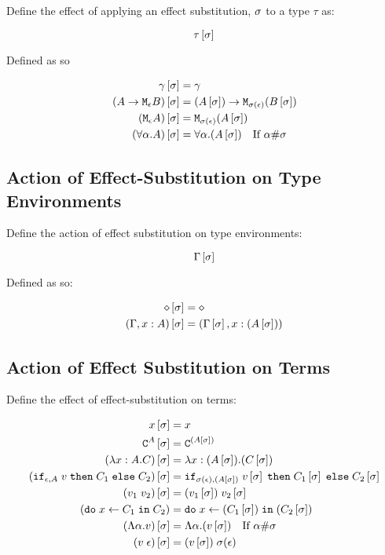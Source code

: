 {    Define the effect of applying an effect substitution, $\si$ to a type $\tau$ as:

    $$\tau\sub{\si}$$

    Defined as so

    \begin{align}
        \g\sub{\si} &= \g \\
        (\lamtype{A}{\e}{B})\sub{\si} &= \lamtype{(A\sub{\si})}{\si(\e)}{(B\sub{\si})} \\
        (\M{\e}{A})\ssi &= \M{\si(\e)}{(A\ssi)}\\
        (\all{\a}{A})\ssi &= \all{\a}{(A\ssi)}\qt{If $\a\#\si$}
    \end{align}


    \subsection{Action of Effect-Substitution on Type Environments}

    Define the action of effect substitution on type environments:
    
    $$\G\ssi$$

    Defined as so:

    \begin{align*}
        \nil\ssi & = \nil \\
        (\gax)\ssi &= (\G\ssi, x:(A\ssi))\\
    \end{align*}


    \subsection{Action of Effect Substitution on Terms}

    Define the effect of effect-substitution on terms:

    \begin{align}
        x\ssi & = x \\
        \const{A}\ssi & = \const{(A\ssi)} \\
        (\lam{x}{A}{C})\ssi &= \lam{x}{(A\ssi)}{(C\ssi)}\\
        (\ifthenelse{\e}{A}{v}{C_1}{C_2})\ssi &= \ifthenelse{\si(\e)}{(A\ssi)}{v\ssi}{C_1\ssi}{C_2\ssi}\\
        (\apply{v_1}{v_2})\ssi&= \apply{(v_1\ssi)}{v_2\ssi}\\
        (\doin{x}{C_1}{C_2})&= \doin{x}{(C_1\ssi)}{(C_2\ssi)}\\
        (\elam{\a}{v})\ssi & = \elam{\a}{(v\ssi)}\qt{If $\a\#\si$}\\
        (\eapp{v}{\e})\ssi & = \eapp{(v\ssi)}{\si(\e)}\\
    \end{align}


}
